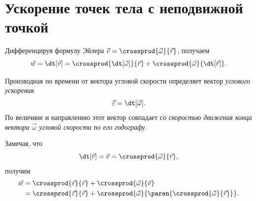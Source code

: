 \section{Ускорение точек тела с неподвижной точкой}

Дифференцируя формулу Эйлера $\vec{v} = \crossprod{\vec{\omega}}{\vec{r}}$,
получаем
\begin{equation}
  \vec{w} = \dt[\vec{v}] = \crossprod{\dt[\vec{\omega}]}{\vec{r}}
    + \crossprod{\vec{\omega}}{\dt[\vec{r}]}.
\end{equation}

Производная по времени от вектора угловой скорости определяет вектор
\textit{углового ускорения}
\begin{equation}
  \vec{\varepsilon} = \dt[\vec{\omega}].
\end{equation}
По величине и направлению этот вектор совпадает со \textit{скоростью движения
конца вектора $\vec{\omega}$ угловой скорости по его годографу}.

Замечая, что
\begin{equation*}
  \dt[\vec{r}] = \vec{v} = \crossprod{\vec{\omega}}{\vec{r}},
\end{equation*}
получим
\begin{equation}
  \begin{aligned}
    \vec{w} &= \crossprod{\vec{\varepsilon}}{\vec{r}} +
      \crossprod{\vec{\omega}}{\vec{v}} \\
    &= \crossprod{\vec{\varepsilon}}{\vec{r}} +
      \crossprod{\vec{\omega}}{\paren{\crossprod{\vec{\omega}}{\vec{r}}}}.
  \end{aligned}
\end{equation}

